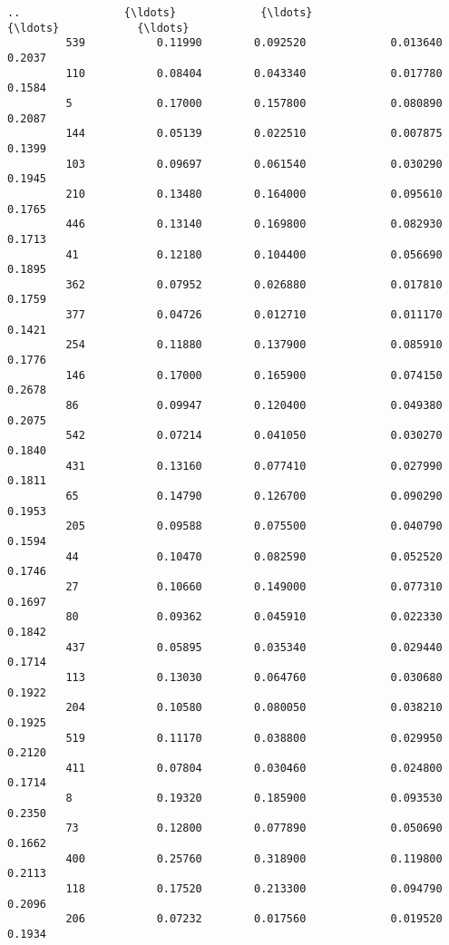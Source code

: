 \documentclass[11pt]{article}
\begin{document}
\begin{Verbatim}[commandchars=\\\{\}]
         ..                {\ldots}             {\ldots}                  {\ldots}            {\ldots}   
         539           0.11990        0.092520             0.013640         0.2037   
         110           0.08404        0.043340             0.017780         0.1584   
         5             0.17000        0.157800             0.080890         0.2087   
         144           0.05139        0.022510             0.007875         0.1399   
         103           0.09697        0.061540             0.030290         0.1945   
         210           0.13480        0.164000             0.095610         0.1765   
         446           0.13140        0.169800             0.082930         0.1713   
         41            0.12180        0.104400             0.056690         0.1895   
         362           0.07952        0.026880             0.017810         0.1759   
         377           0.04726        0.012710             0.011170         0.1421   
         254           0.11880        0.137900             0.085910         0.1776   
         146           0.17000        0.165900             0.074150         0.2678   
         86            0.09947        0.120400             0.049380         0.2075   
         542           0.07214        0.041050             0.030270         0.1840   
         431           0.13160        0.077410             0.027990         0.1811   
         65            0.14790        0.126700             0.090290         0.1953   
         205           0.09588        0.075500             0.040790         0.1594   
         44            0.10470        0.082590             0.052520         0.1746   
         27            0.10660        0.149000             0.077310         0.1697   
         80            0.09362        0.045910             0.022330         0.1842   
         437           0.05895        0.035340             0.029440         0.1714   
         113           0.13030        0.064760             0.030680         0.1922   
         204           0.10580        0.080050             0.038210         0.1925   
         519           0.11170        0.038800             0.029950         0.2120   
         411           0.07804        0.030460             0.024800         0.1714   
         8             0.19320        0.185900             0.093530         0.2350   
         73            0.12800        0.077890             0.050690         0.1662   
         400           0.25760        0.318900             0.119800         0.2113   
         118           0.17520        0.213300             0.094790         0.2096   
         206           0.07232        0.017560             0.019520         0.1934   
         

\end{Verbatim}
\end{document}
